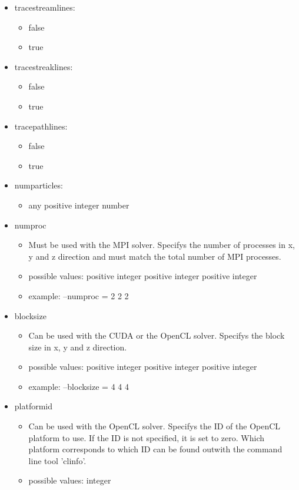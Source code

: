 \documentclass{article}%
\begin{document}
\begin{itemize}
\begin{itemize}
	\end{itemize}
\item tracestreamlines:
	\begin{itemize}
	\item false
	\item true
	\end{itemize}
\item tracestreaklines:
	\begin{itemize}
	\item false
	\item true
	\end{itemize}
\item tracepathlines:
	\begin{itemize}
	\item false
	\item true
	\end{itemize}
\item numparticles:
	\begin{itemize}
	\item any positive integer number
	\end{itemize}
\item numproc
	\begin{itemize}
	\item Must be used with the MPI solver. Specifys the number of processes in x, y and z direction and must match the total number of MPI processes.
	\item possible values: positive integer positive integer positive integer
	\item example: --numproc = 2 2 2
	\end{itemize}
\item blocksize
	\begin{itemize}
	\item Can be used with the CUDA or the OpenCL solver. Specifys the block size in x, y and z direction.
	\item possible values: positive integer positive integer positive integer
	\item example: --blocksize = 4 4 4
	\end{itemize}
\item platformid
	\begin{itemize}
	\item Can be used with the OpenCL solver. Specifys the ID of the OpenCL platform to use. If the ID is not specified, it is set to zero. Which platform corresponds to which ID can be found outwith the command line tool 'clinfo'.
	\item possible values: integer
	\end{itemize}
\end{itemize}
\end{document}
